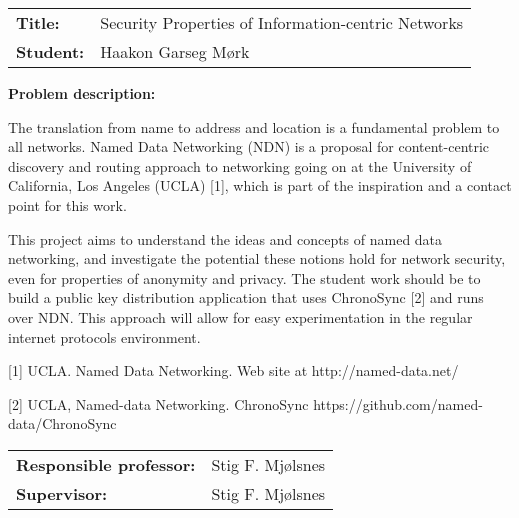\begin{titlingpage}

\noindent
\begin{tabular}{@{}p{4cm}l}
\textbf{Title:} 	& Security Properties of Information-centric Networks \\
\textbf{Student:}	& Haakon Garseg Mørk \\
\end{tabular}

\vspace{4ex}
\noindent\textbf{Problem description:}
\vspace{2ex}

The translation from name to address and location is a fundamental problem to all networks.
Named Data Networking (NDN) is a proposal for content-centric discovery and routing approach to networking
going on at the University of California, Los Angeles (UCLA) [1], which is part of the inspiration and a contact point for this work.

This project aims to understand the ideas and concepts of named data networking, and investigate the
potential these notions hold for network security, even for properties of anonymity and privacy. 
The student work should be to build a public key distribution application that uses ChronoSync [2] and runs over NDN.
This approach will allow for easy experimentation in the regular internet protocols environment.     

[1]  UCLA.  Named Data Networking. Web site at http://named-data.net/

[2]  UCLA, Named-data Networking. ChronoSync https://github.com/named-data/ChronoSync

\noindent
\begin{tabular}{@{}p{4cm}l}
\textbf{Responsible professor:} 	& Stig F. Mjølsnes \\
\textbf{Supervisor:}			& Stig F. Mjølsnes \\
\end{tabular}

\end{titlingpage}